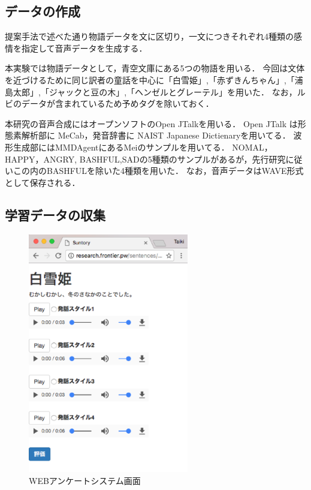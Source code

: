 \subsection{データの作成}
提案手法で述べた通り物語データを文に区切り，一文につきそれぞれ4種類の感情を指定して音声データを生成する．

本実験では物語データとして，青空文庫\cite{aozora}にある5つの物語を用いる．
今回は文体を近づけるために同じ訳者の童話を中心に「白雪姫」,「赤ずきんちゃん」,「浦島太郎」,「ジャックと豆の木」,「ヘンゼルとグレーテル」を用いた．
なお，ルビのデータが含まれているため予めタグを除いておく．

本研究の音声合成にはオープンソフトのOpen JTalk\cite{jtalk}を用いる．
Open JTalk は形態素解析部に MeCab\cite{mecab}，発音辞書に NAIST Japanese Dictienary\cite{naist}を用いてる．
波形生成部にはMMDAgent\cite{mei}にあるMeiのサンプルを用いてる．
NOMAL，HAPPY，ANGRY, BASHFUL,SADの5種類のサンプルがあるが，先行研究に従いこの内のBASHFULを除いた4種類を用いた．
なお，音声データはWAVE形式として保存される．

\subsection{学習データの収集}
\begin{figure}[ht]
  \begin{center}
    \includegraphics[clip,width=7.0cm]{fig/web.eps}
    \caption{WEBアンケートシステム画面}
    \label{fig:web}
  \end{center}
\end{figure}

